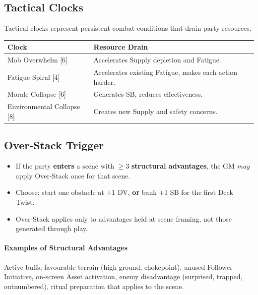 \subsection{Tactical Clocks}
\label{subsec:tactical-clocks}

Tactical clocks represent persistent combat conditions that drain party resources.

\begin{tcolorbox}[title=Tactical Clock Effects, colback=white!97!gray, colframe=black!80!gray]
\begin{tabularx}{\textwidth}{lX}
\toprule
\textbf{Clock} & \textbf{Resource Drain} \\
\midrule
Mob Overwhelm [6] & Accelerates Supply depletion and Fatigue. \\
Fatigue Spiral [4] & Accelerates existing Fatigue, makes each action harder. \\
Morale Collapse [6] & Generates SB, reduces effectiveness. \\
Environmental Collapse [8] & Creates new Supply and safety concerns. \\
\bottomrule
\end{tabularx}
\end{tcolorbox}

\subsection{Over‑Stack Trigger}
\label{subsec:overstack-trigger}

\begin{itemize}
  \item If the party \textbf{enters} a scene with \(\geq 3\) \textbf{structural advantages}, the GM \textit{may} apply Over‑Stack once for that scene.
  \item Choose: start one obstacle at +1 DV, \textbf{or} bank +1 SB for the first Deck Twist.
  \item Over‑Stack applies only to advantages held at scene framing, not those generated through play.
\end{itemize}

\paragraph{Examples of Structural Advantages}
Active buffs, favourable terrain (high ground, chokepoint), unused Follower Initiative, on‑screen Asset activation, enemy disadvantage (surprised, trapped, outnumbered), ritual preparation that applies to the scene.


